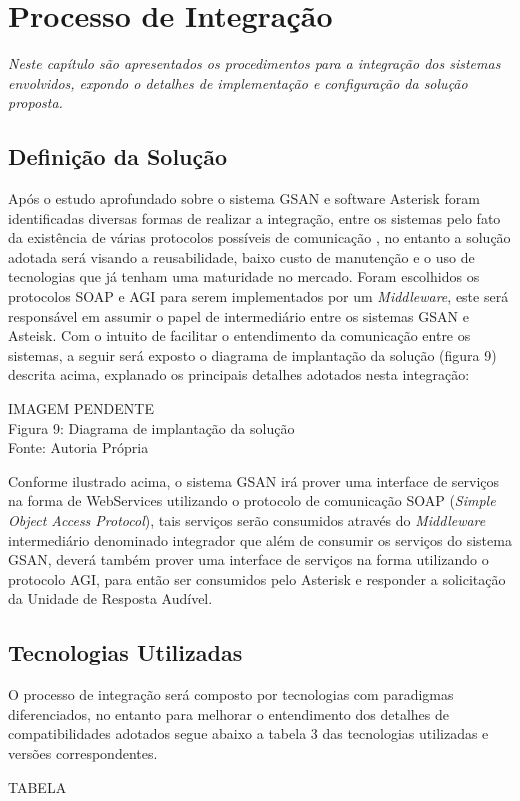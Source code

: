 \chapter[Processo de Integração]{\textbf{P}rocesso de \textbf{I}ntegração}

\textit{Neste capítulo são apresentados os procedimentos para a integração dos sistemas envolvidos, expondo o detalhes de implementação e configuração da solução proposta.}


\section{Definição da Solução}

Após o estudo aprofundado sobre o sistema GSAN e software Asterisk foram identificadas diversas formas de realizar a integração, entre os sistemas pelo fato da existência de várias protocolos possíveis de comunicação , no entanto a solução adotada será visando a reusabilidade, baixo custo de manutenção e o uso de tecnologias que já tenham uma maturidade no mercado. Foram escolhidos os protocolos SOAP e AGI para serem implementados por um \textit{Middleware}, este será responsável em assumir o papel de intermediário entre os sistemas GSAN e Asteisk. Com o intuito de facilitar o entendimento da comunicação entre os sistemas, a seguir será exposto o diagrama de implantação da solução (figura 9) descrita acima, explanado os principais detalhes adotados nesta integração:

\begin{center}
	IMAGEM PENDENTE \\
	Figura 9: Diagrama de implantação da solução \\
	Fonte: Autoria Própria	\\
\end{center}

Conforme ilustrado acima, o sistema GSAN irá prover uma interface de serviços na forma de WebServices utilizando o protocolo de comunicação SOAP (\textit{Simple Object Access Protocol}), tais serviços serão consumidos através do \textit{Middleware} intermediário denominado integrador que além de consumir os serviços do sistema GSAN, deverá também prover uma interface de serviços na forma utilizando o protocolo AGI, para então ser consumidos pelo Asterisk e responder a solicitação da Unidade de Resposta Audível.


\section{Tecnologias Utilizadas}
O processo de integração será composto por tecnologias com paradigmas diferenciados, no entanto para melhorar o entendimento dos detalhes de compatibilidades adotados segue abaixo a tabela 3 das tecnologias utilizadas e versões correspondentes.

TABELA